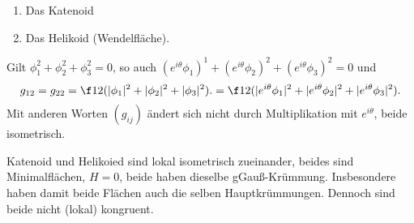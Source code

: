 \begin{ex}
	\begin{enumerate}[1.]
		\item
			Das Katenoid
		\item
			Das Helikoid (Wendelfläche).
	\end{enumerate}
	Gilt $\phi_1^2 + \phi_2^2 + \phi_3^2 = 0$, so auch $(e^{i\theta} \phi_1)^1 + (e^{i\theta} \phi_2)^2 + (e^{i\theta} \phi_3)^2 = 0$ und
	\[
		g_{12}
		= g_{22}
		= \f 12 (|\phi_1|^2 + |\phi_2|^2 + |\phi_3|^2).
		= \f 12 (|e^{i\theta}\phi_1|^2 + |e^{i\theta} \phi_2|^2 + |e^{i\theta} \phi_3|^2).
	\]
	Mit anderen Worten $(g_{ij})$ ändert sich nicht durch Multiplikation mit $e^{i\theta}$, beide isometrisch.

	Katenoid und Helikoied sind lokal isometrisch zueinander, beides sind Minimalflächen, $H = 0$, beide haben dieselbe gGauß-Krümmung.
	Insbesondere haben damit beide Flächen auch die selben Hauptkrümmungen.
	Dennoch sind beide nicht (lokal) kongruent.
\end{ex}

